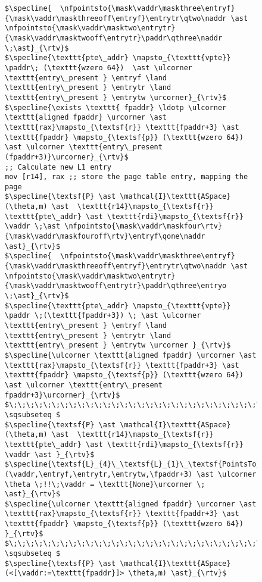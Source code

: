 \begin{figure}
\begin{lstlisting}[mathescape]
$\specline{  \nfpointsto{\mask\vaddr\maskthree\entryf}{\mask\vaddr\maskthreeoff\entryf}\entrytr\qtwo\naddr \ast \nfpointsto{\mask\vaddr\masktwo\entrytr}{\mask\vaddr\masktwooff\entrytr}\paddr\qthree\naddr \;\ast}_{\rtv}$
$\specline{\texttt{pte\_addr} \mapsto_{\texttt{vpte}} \paddr\; (\texttt{wzero 64})  \ast \ulcorner \texttt{entry\_present } \entryf \land \texttt{entry\_present } \entrytr \land  \texttt{entry\_present } \entrytw \urcorner}_{\rtv}$
$\specline{\exists \texttt{ fpaddr} \ldotp \ulcorner \texttt{aligned fpaddr} \urcorner \ast \texttt{rax}\mapsto_{\textsf{r}} \texttt{fpaddr+3} \ast \texttt{fpaddr} \mapsto_{\textsf{p}} (\texttt{wzero 64}) \ast \ulcorner \texttt{entry\_present (fpaddr+3)}\urcorner}_{\rtv}$
;; Calculate new L1 entry
mov [r14], rax ;; store the page table entry, mapping the page
$\specline{\textsf{P} \ast \mathcal{I}\texttt{ASpace}(\theta,m) \ast  \texttt{r14}\mapsto_{\textsf{r}} \texttt{pte\_addr} \ast \texttt{rdi}\mapsto_{\textsf{r}} \vaddr \;\ast \nfpointsto{\mask\vaddr\maskfour\rtv}{\mask\vaddr\maskfouroff\rtv}\entryf\qone\naddr \ast}_{\rtv}$ 
$\specline{  \nfpointsto{\mask\vaddr\maskthree\entryf}{\mask\vaddr\maskthreeoff\entryf}\entrytr\qtwo\naddr \ast \nfpointsto{\mask\vaddr\masktwo\entrytr}{\mask\vaddr\masktwooff\entrytr}\paddr\qthree\entryo \;\ast}_{\rtv}$
$\specline{\texttt{pte\_addr} \mapsto_{\texttt{vpte}} \paddr \;(\texttt{fpaddr+3}) \; \ast \ulcorner \texttt{entry\_present } \entryf \land \texttt{entry\_present } \entrytr \land  \texttt{entry\_present } \entrytw \urcorner }_{\rtv}$
$\specline{\ulcorner \texttt{aligned fpaddr} \urcorner \ast \texttt{rax}\mapsto_{\textsf{r}} \texttt{fpaddr+3} \ast \texttt{fpaddr} \mapsto_{\textsf{p}} (\texttt{wzero 64}) \ast \ulcorner \texttt{entry\_present fpaddr+3}\urcorner}_{\rtv}$
$\;\;\;\;\;\;\;\;\;\;\;\;\;\;\;\;\;\;\;\;\;\;\;\;\;\;\;\;\;\;\;\;\;\;\;\;\;\;\;\;\;\;\;\; \sqsubseteq $
$\specline{\textsf{P} \ast \mathcal{I}\texttt{ASpace}(\theta,m) \ast  \texttt{r14}\mapsto_{\textsf{r}} \texttt{pte\_addr} \ast \texttt{rdi}\mapsto_{\textsf{r}} \vaddr \ast }_{\rtv}$
$\specline{\textsf{L}_{4}\_\textsf{L}_{1}\_\textsf{PointsTo}(\vaddr,\entryf,\entrytr,\entrytw,\fpaddr+3) \ast \ulcorner \theta \;!!\;\vaddr = \texttt{None}\urcorner \; \ast}_{\rtv}$
$\specline{\ulcorner \texttt{aligned fpaddr} \urcorner \ast \texttt{rax}\mapsto_{\textsf{r}} \texttt{fpaddr+3} \ast \texttt{fpaddr} \mapsto_{\textsf{p}} (\texttt{wzero 64}) }_{\rtv}$
$\;\;\;\;\;\;\;\;\;\;\;\;\;\;\;\;\;\;\;\;\;\;\;\;\;\;\;\;\;\;\;\;\;\;\;\;\;\;\;\;\;\;\;\; \sqsubseteq $
$\specline{\textsf{P} \ast \mathcal{I}\texttt{ASpace} (<[\vaddr:=\texttt{fpaddr}]> \theta,m) \ast}_{\rtv}$

\end{lstlisting}
\end{figure}
